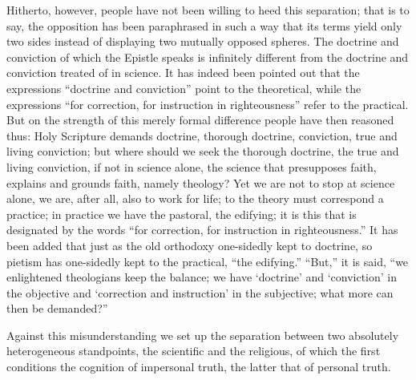 \documentclass[12pt]{book}
\newcommand{\opage}[1]{\marginnote{\footnotesize\textit{[#1]}}}
\begin{document}
Hitherto, however, people have not been willing to heed this separation;
that is to say, the opposition has been paraphrased in such a way that its
terms yield only two sides instead of displaying two mutually opposed
spheres. The doctrine and conviction of which the Epistle speaks is
infinitely different from the doctrine and conviction treated of in
science. It has indeed been pointed out that the expressions ``doctrine
and conviction'' point to the theoretical, while the expressions ``for
correction, for instruction in righteousness'' refer to the practical. But
on the strength of this merely formal difference people have then reasoned
thus: Holy Scripture demands doctrine, thorough doctrine, conviction, true
and living
\opage{195}\setcounter{footnote}{0}%
conviction; but where should we seek the thorough doctrine, the true and
living conviction, if not in science alone, the science that presupposes
faith, explains and grounds faith, namely theology? Yet we are not to stop
at science alone, we are, after all, also to work for life; to the theory
must correspond a practice; in practice we have the pastoral, the
edifying; it is this that is designated by the words ``for correction, for
instruction in righteousness.'' It has been added that just as the old
orthodoxy one-sidedly kept to doctrine, so pietism has one-sidedly kept to
the practical, ``the edifying.'' ``But,'' it is said, ``we enlightened
theologians keep the balance; we have `doctrine' and `conviction' in the
objective and `correction and instruction' in the subjective; what more
can then be demanded?''

Against this misunderstanding we set up the separation between two
absolutely heterogeneous standpoints, the scientific and the religious, of
which the first conditions the cognition of impersonal truth, the latter
that of personal truth.
\end{document}
